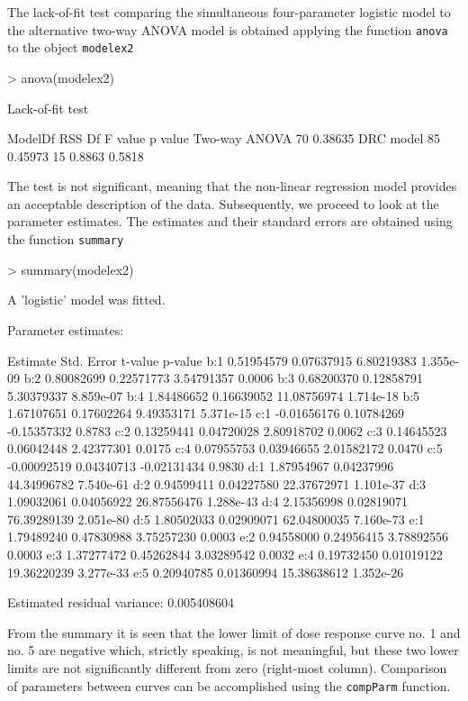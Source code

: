 \documentclass[a4paper]{article}
\begin{document}
The lack-of-fit test comparing the simultaneous four-parameter logistic model to the alternative two-way ANOVA model is obtained applying the
function \verb+anova+ to the object \verb+modelex2+

\begin{Schunk}
\begin{Sinput}
> anova(modelex2)
\end{Sinput}
\begin{Soutput}
Lack-of-fit test

              ModelDf     RSS Df F value p value
Two-way ANOVA      70 0.38635                   
DRC model          85 0.45973 15  0.8863  0.5818
\end{Soutput}
\end{Schunk}
The test is not significant, meaning that the non-linear regression model provides an acceptable description of the data.
Subsequently, we proceed to look at the parameter estimates. The estimates and their standard errors are obtained using the function \verb+summary+

\begin{Schunk}
\begin{Sinput}
> summary(modelex2)
\end{Sinput}
\begin{Soutput}
A 'logistic' model was fitted.

Parameter estimates:

       Estimate  Std. Error     t-value   p-value
b:1  0.51954579  0.07637915  6.80219383 1.355e-09
b:2  0.80082699  0.22571773  3.54791357    0.0006
b:3  0.68200370  0.12858791  5.30379337 8.859e-07
b:4  1.84486652  0.16639052 11.08756974 1.714e-18
b:5  1.67107651  0.17602264  9.49353171 5.371e-15
c:1 -0.01656176  0.10784269 -0.15357332    0.8783
c:2  0.13259441  0.04720028  2.80918702    0.0062
c:3  0.14645523  0.06042448  2.42377301    0.0175
c:4  0.07955753  0.03946655  2.01582172    0.0470
c:5 -0.00092519  0.04340713 -0.02131434    0.9830
d:1  1.87954967  0.04237996 44.34996782 7.540e-61
d:2  0.94599411  0.04227580 22.37672971 1.101e-37
d:3  1.09032061  0.04056922 26.87556476 1.288e-43
d:4  2.15356998  0.02819071 76.39289139 2.051e-80
d:5  1.80502033  0.02909071 62.04800035 7.160e-73
e:1  1.79489240  0.47830988  3.75257230    0.0003
e:2  0.94558000  0.24956415  3.78892556    0.0003
e:3  1.37277472  0.45262844  3.03289542    0.0032
e:4  0.19732450  0.01019122 19.36220239 3.277e-33
e:5  0.20940785  0.01360994 15.38638612 1.352e-26

Estimated residual variance: 0.005408604 
\end{Soutput}
\end{Schunk}
From the summary it is seen that the lower limit of dose response curve no. 1 and no. 5 are negative which, strictly speaking, is not meaningful,
but these two lower limits are not significantly different from zero (right-most column). Comparison of parameters between curves can
be accomplished using the \verb+compParm+ function.
\end{document}
